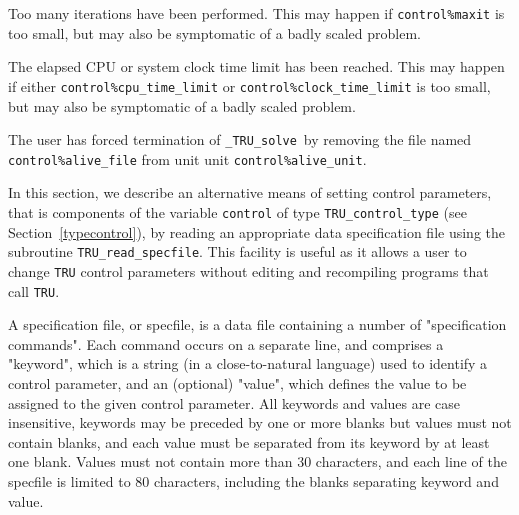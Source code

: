 \documentclass{galahad}
\newcommand{\packagename}{TRU}
\newcommand{\fullpackagename}{\libraryname\_\packagename}
\newcommand{\solver}{{\tt \fullpackagename\_solve}}
\begin{document}
\begin{description}
 Too many iterations have been performed.
  This may happen if
    {\tt control\%maxit} is too small, but may also be symptomatic of
    a badly scaled problem.

 The elapsed CPU or system clock time limit has been
    reached. This may happen if either {\tt control\%cpu\_time\_limit} or
    {\tt control\%clock\_time\_limit} is too small, but may also be symptomatic
    of a badly scaled problem.

 The user has forced termination of \solver\
     by removing the file named {\tt control\%a\-live\_file} from unit
     unit {\tt control\%alive\_unit}.

\end{description}


\galfeatures
\noindent In this section, we describe an alternative means of setting
control parameters, that is components of the variable {\tt control} of type
{\tt \packagename\_control\_type}
(see Section~\ref{typecontrol}),
by reading an appropriate data specification file using the
subroutine {\tt \packagename\_read\_specfile}. This facility
is useful as it allows a user to change  {\tt \packagename} control parameters
without editing and recompiling programs that call {\tt \packagename}.

A specification file, or specfile, is a data file containing a number of
"specification commands". Each command occurs on a separate line,
and comprises a "keyword",
which is a string (in a close-to-natural language) used to identify a
control parameter, and
an (optional) "value", which defines the value to be assigned to the given
control parameter. All keywords and values are case insensitive,
keywords may be preceded by one or more blanks but
values must not contain blanks, and
each value must be separated from its keyword by at least one blank.
Values must not contain more than 30 characters, and
each line of the specfile is limited to 80 characters,
including the blanks separating keyword and value.
\end{document}

